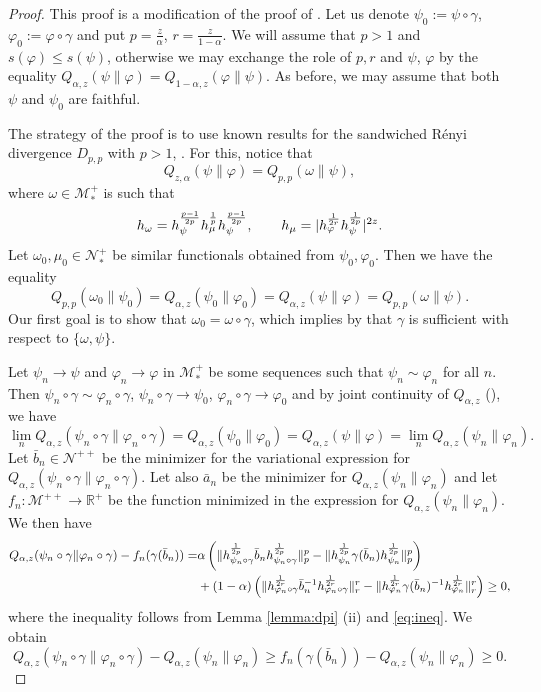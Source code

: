 \documentclass[12pt]{article}
\theoremstyle{definition}
\theoremstyle{remark}
\numberwithin{equation}{section}
\def\Me{\mathcal M}
\def\Ne{\mathcal N}
\def\ffi{\varphi}
\begin{document}
\begin{proof} This proof is a modification of the proof of \cite[Thm.
5.1]{jencova2021renyi}. Let us denote $\psi_0:=\psi\circ\gamma$,
$\varphi_0:=\varphi\circ\gamma$ and put $p=\frac{z}{\alpha}$, $r=\frac{z}{1-\alpha}$.  
We will assume that $p>1$ and $s(\ffi)\le s(\psi)$,
otherwise we may exchange the role of $p,r$ and $\psi$, $\ffi$ by the equality
$Q_{\alpha,z}(\psi\|\varphi)=Q_{1-\alpha,z}(\varphi\|\psi)$. As before, we may assume that
both $\psi$ and $\psi_0$ are faithful.

The strategy of the proof is to use known results for the sandwiched R\'enyi divergence
$D_{p,p}$ with $p>1$, \cite[]{jencova2018renyi}. For this, notice that
\[
Q_{z,\alpha}(\psi\|\ffi)=Q_{p,p}(\omega\|\psi),
\]
where $\omega\in \Me_*^+$ is such that
\begin{equation}\label{eq:omega}
h_\omega=h_\psi^{p-1\over 2p}h_\mu^{\frac1p}h_\psi^{p-1\over 2p},\qquad
h_{\mu}=|h_{\ffi}^{1\over 2r}h_{\psi}^{1\over 2p}|^{2z}.
\end{equation}
Let $\omega_0,\mu_0\in \Ne_*^+$ be similar functionals obtained from $\psi_0,\ffi_0$. Then
we have the equality
\[
Q_{p,p}(\omega_0\|\psi_0)=Q_{\alpha,z}(\psi_0\|\ffi_0)=Q_{\alpha,z}(\psi\|\ffi)=Q_{p,p}(\omega\|\psi).
\]
Our first goal is to show that $\omega_0=\omega\circ\gamma$, which implies by
\cite[]{jencova2018renyi} that $\gamma$ is sufficient with respect to $\{\omega,\psi\}$. 

Let $\psi_n\to\psi$ and
$\varphi_n\to \varphi$ in $\Me_*^+$ be some sequences such that $\psi_n\sim \ffi_n$ for
all $n$. Then $\psi_n\circ\gamma\sim \ffi_n\circ\gamma$, $\psi_n\circ\gamma\to \psi_0$, $\ffi_n \circ \gamma\to \ffi_0$ and by joint
continuity of $Q_{\alpha,z}$ (\cite[Thm. 1 (iv)]{kato2023onrenyi}), we have
\[
\lim_n
Q_{\alpha,z}(\psi_n\circ\gamma\|\ffi_n\circ\gamma)=Q_{\alpha,z}(\psi_0\|\ffi_0)=Q_{\alpha,z}(\psi\|\ffi)=\lim_n
Q_{\alpha,z}(\psi_n\|\ffi_n).
\]
Let $\bar b_{n}\in \Ne^{++}$ be the minimizer for the variational expression for
$Q_{\alpha,z}(\psi_n\circ\gamma\|\ffi_n\circ\gamma)$. Let also $\bar a_n$ be the minimizer
for $Q_{\alpha,z}(\psi_n\|\ffi_n)$ and let $f_n:\Me^{++}\to \mathbb R^+$
be the function minimized in the expression for $Q_{\alpha,z}(\psi_n\|\ffi_n)$. 
We then have 
\begin{align*}
Q_{\alpha,z}(\psi_n\circ\gamma\|\ffi_n\circ\gamma)-f_n(\gamma(\bar
b_{n}))=&\alpha\left(\|h_{\psi_n\circ\gamma}^{\frac1{2p}}\bar b_{n}
h_{\psi_n\circ\gamma}^{\frac1{2p}}\|_p^p-\|h_{\psi_n}^{1\over 2p}\gamma(\bar
b_n)h_{\psi_n}^{1\over 2p}\|_p^p\right)\\
& + (1-\alpha)\left(\|h_{\ffi_n\circ\gamma}^{\frac1{2r}}\bar b_{n}^{-1}
h_{\ffi_n\circ\gamma}^{\frac1{2r}}\|_r^r-\|h_{\ffi_n}^{1\over 2r}\gamma(\bar
b_n)^{-1}h_{\ffi_n}^{1\over 2r}\|_r^r\right)\ge 0,
\end{align*}
where the inequality follows from Lemma \ref{lemma:dpi} (ii) and \eqref{eq:ineq}. We
obtain
\begin{equation}\label{eq:qfn}
Q_{\alpha,z}(\psi_n\circ\gamma\|\ffi_n\circ\gamma)-Q_{\alpha,z}(\psi_n\|\ffi_n)\ge f_n(\gamma(\bar
b_{n}))-Q_{\alpha,z}(\psi_n\|\ffi_n)\ge 0.
\end{equation}


\end{proof}
\end{document}
